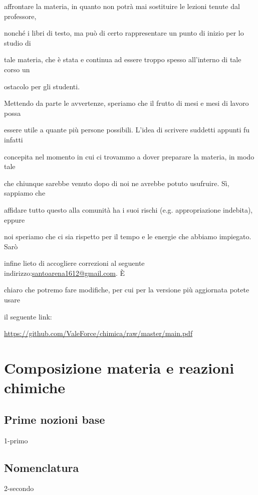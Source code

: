 \documentclass[openany,12pt]{book}%
\newcommand{\E}{È \hspace{0.1mm}}
\newcommand\blankpage{%
    \null
    \thispagestyle{empty}%
    \newpage}
\begin{document}
affrontare la materia, in quanto non potrà mai sostituire le lezioni tenute dal professore,

nonché i libri di testo, ma può di certo rappresentare un punto di inizio per lo studio di

tale materia, che è stata e continua ad essere troppo spesso all'interno di tale corso un

ostacolo per gli studenti.

\vspace{0.2cm}
Mettendo da parte le avvertenze, speriamo che il frutto di mesi e mesi di lavoro possa

essere utile a quante più persone possibili. L'idea di scrivere suddetti appunti fu infatti

concepita nel momento in cui ci trovammo a dover preparare la materia, in modo tale

che chiunque sarebbe venuto dopo di noi ne avrebbe potuto usufruire. Sì, sappiamo che

affidare tutto questo alla comunità ha i suoi rischi (e.g. appropriazione indebita), eppure

noi speriamo che ci sia rispetto per il tempo e le energie che abbiamo impiegato. Sarò

infine lieto di accogliere correzioni al seguente indirizzo:\hspace{0.15cm}\href{mailto:santoarena1612@gmail.com}{santoarena1612@gmail.com}. \E

chiaro che potremo fare modifiche, per cui per la versione più aggiornata potete usare

il seguente link:

\begin{center}
\url{https://github.com/ValeForce/chimica/raw/master/main.pdf}
\end{center}

\afterpage{\blankpage}
\newpage

\chapter{Composizione materia e reazioni chimiche}

\section{Prime nozioni base}%
{1-primo}

\newpage

\section{Nomenclatura}
{2-secondo}
\end{document}
